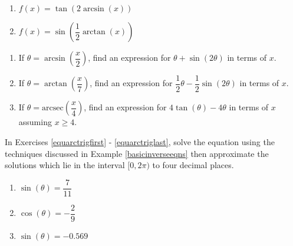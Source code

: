 \documentclass{ximera}
\begin{document}
\begin{multicols}{2}

\begin{enumerate}

\setcounter{enumi}{\value{HW}}

\item $f(x) = \tan \left( 2\arcsin(x) \right)$ 
\item $f(x) = \sin \left( \dfrac{1}{2}\arctan(x) \right)$  \label{rewritelast}

\setcounter{HW}{\value{enumi}}

\end{enumerate}

\end{multicols}

\begin{enumerate}

\setcounter{enumi}{\value{HW}}

\item If $\theta = \arcsin\left(\dfrac{x}{2}\right)$,  find an expression for $\theta + \sin(2\theta)$ in terms of $x$.

\item If $\theta = \arctan\left(\dfrac{x}{7}\right)$, find an expression for $\dfrac{1}{2}\theta - \dfrac{1}{2}\sin(2\theta)$ in terms of $x$.

\item If $\theta = \mbox{arcsec}\left(\dfrac{x}{4}\right)$,  find an expression for $4\tan(\theta) - 4\theta$ in terms of $x$ assuming $x \geq 4$.

\setcounter{HW}{\value{enumi}}

\end{enumerate}

In Exercises \ref{equarctrigfirst} - \ref{equarctriglast}, solve the equation using the techniques discussed in Example \ref{basicinverseeqns} then approximate the solutions which lie in the interval $[0, 2\pi)$ to four decimal places.

\begin{multicols}{3}

\begin{enumerate}

\setcounter{enumi}{\value{HW}}

\item $\sin(\theta) = \dfrac{7}{11}$ \label{equarctrigfirst}
\item $\cos(\theta) = -\dfrac{2}{9}$
\item $\sin(\theta) = -0.569$ 

\setcounter{HW}{\value{enumi}}

\end{enumerate}

\end{multicols}
\end{document}
